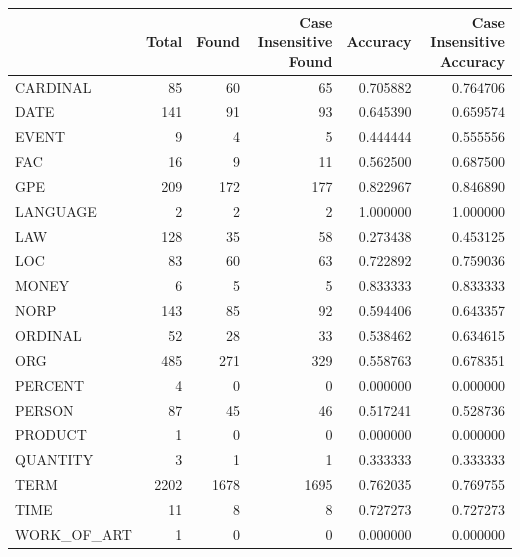 \begin{tabular}{lrrrrr}
\toprule
 & Total & Found & Case Insensitive Found & Accuracy & Case Insensitive Accuracy \\
\midrule
CARDINAL & 85 & 60 & 65 & 0.705882 & 0.764706 \\
DATE & 141 & 91 & 93 & 0.645390 & 0.659574 \\
EVENT & 9 & 4 & 5 & 0.444444 & 0.555556 \\
FAC & 16 & 9 & 11 & 0.562500 & 0.687500 \\
GPE & 209 & 172 & 177 & 0.822967 & 0.846890 \\
LANGUAGE & 2 & 2 & 2 & 1.000000 & 1.000000 \\
LAW & 128 & 35 & 58 & 0.273438 & 0.453125 \\
LOC & 83 & 60 & 63 & 0.722892 & 0.759036 \\
MONEY & 6 & 5 & 5 & 0.833333 & 0.833333 \\
NORP & 143 & 85 & 92 & 0.594406 & 0.643357 \\
ORDINAL & 52 & 28 & 33 & 0.538462 & 0.634615 \\
ORG & 485 & 271 & 329 & 0.558763 & 0.678351 \\
PERCENT & 4 & 0 & 0 & 0.000000 & 0.000000 \\
PERSON & 87 & 45 & 46 & 0.517241 & 0.528736 \\
PRODUCT & 1 & 0 & 0 & 0.000000 & 0.000000 \\
QUANTITY & 3 & 1 & 1 & 0.333333 & 0.333333 \\
TERM & 2202 & 1678 & 1695 & 0.762035 & 0.769755 \\
TIME & 11 & 8 & 8 & 0.727273 & 0.727273 \\
WORK_OF_ART & 1 & 0 & 0 & 0.000000 & 0.000000 \\
\bottomrule
\end{tabular}

